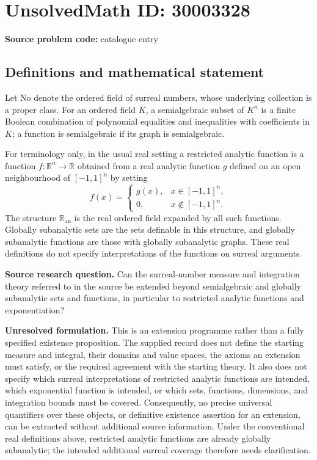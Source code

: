 \documentclass[11pt]{article}
\newcommand{\R}{\mathbb{R}}
\begin{document}
\section*{UnsolvedMath ID: 30003328}
\textbf{Source problem code:} catalogue entry
\subsection{Definitions and mathematical statement}
Let \(\mathrm{No}\) denote the ordered field of surreal numbers, whose underlying collection is a proper class. For an ordered field \(K\), a semialgebraic subset of \(K^n\) is a finite Boolean combination of polynomial equalities and inequalities with coefficients in \(K\); a function is semialgebraic if its graph is semialgebraic.

For terminology only, in the usual real setting a restricted analytic function is a function \(f\colon\R^n\to\R\) obtained from a real analytic function \(g\) defined on an open neighbourhood of \([-1,1]^n\) by setting
\[
f(x)=\begin{cases}g(x),&x\in[-1,1]^n,\\0,&x\notin[-1,1]^n.\end{cases}
\]
The structure \(\R_{\mathrm{an}}\) is the real ordered field expanded by all such functions. Globally subanalytic sets are the sets definable in this structure, and globally subanalytic functions are those with globally subanalytic graphs. These real definitions do not specify interpretations of the functions on surreal arguments.

\textbf{Source research question.} Can the surreal-number measure and integration theory referred to in the source be extended beyond semialgebraic and globally subanalytic sets and functions, in particular to restricted analytic functions and exponentiation?

\textbf{Unresolved formulation.} This is an extension programme rather than a fully specified existence proposition. The supplied record does not define the starting measure and integral, their domains and value spaces, the axioms an extension must satisfy, or the required agreement with the starting theory. It also does not specify which surreal interpretations of restricted analytic functions are intended, which exponential function is intended, or which sets, functions, dimensions, and integration bounds must be covered. Consequently, no precise universal quantifiers over these objects, or definitive existence assertion for an extension, can be extracted without additional source information. Under the conventional real definitions above, restricted analytic functions are already globally subanalytic; the intended additional surreal coverage therefore needs clarification.
\end{document}
